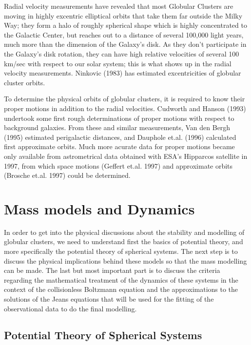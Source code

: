 Radial velocity measurements have revealed that most Globular Clusters are moving in highly excentric elliptical orbits that take them far outside the Milky Way; they form a halo of roughly spherical shape which is highly concentrated to the Galactic Center, but reaches out to a distance of several 100,000 light years, much more than the dimension of the Galaxy's disk. As they don't participate in the Galaxy's disk rotation, they can have high relative velocities of several 100 km/sec with respect to our solar system; this is what shows up in the radial velocity measurements. Ninkovic (1983) has estimated excentricities of globular cluster orbits.

To determine the physical orbits of globular clusters, it is required to know their proper motions in addition to the radial velocities. Cudworth and Hanson (1993) undertook some first rough determinations of proper motions with respect to background galaxies. From these and similar measurements, Van den Bergh (1995) estimated perigalactic distances, and Dauphole et.al. (1996) calculated first approximate orbits. Much more acurate data for proper motions became only available from astrometrical data obtained with ESA's Hipparcos satellite in 1997, from which space motions (Geffert et.al. 1997) and approximate orbits (Brosche et.al. 1997) could be determined.

\section{Mass models and Dynamics}

In order to get into the physical discussions about the stability and modelling of globular clusters, we need to understand first the basics of potential theory, and more specifically the potential theory of spherical systems. The next step is to discuss the physical implications behind these models so that the mass modelling can be made. The last but most important part is to discuss the criteria regarding the mathematical treatment of the dynamics of these systems in the context of the collisionless Boltzmann equation and the approximations to the solutions of the Jeans equations that will be used for the fitting of the observational data to do the final modelling.

\subsection{Potential Theory of Spherical Systems}

